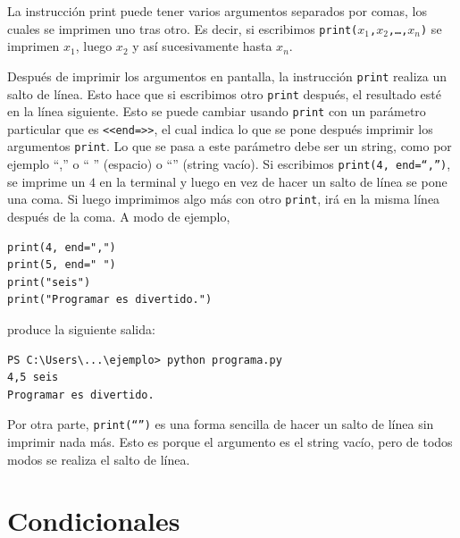 \documentclass[a4paper, 12pt]{report}
\theoremstyle{definition}
\begin{document}
La instrucción print puede tener varios argumentos separados por comas, los cuales se imprimen uno tras otro. Es decir, si escribimos {\tt print($x_1$,$x_2$,\dots,$x_n$)} se imprimen $x_1$, luego $x_2$ y así sucesivamente hasta $x_n$.

Después de imprimir los argumentos en pantalla, la instrucción {\tt print} realiza un salto de línea. Esto hace que si escribimos otro {\tt print} después, el resultado esté en la línea siguiente. Esto se puede cambiar usando {\tt print} con un parámetro particular que es {\tt <<end=>>}, el cual indica lo que se pone después imprimir los argumentos {\tt print}. Lo que se pasa a este parámetro debe ser un string, como por ejemplo ``,'' o `` '' (espacio) o ``\hspace{0.1em}'' (string vacío). Si escribimos {\tt print(4, end=``,'')}, se imprime un $4$ en la terminal y luego en vez de hacer un salto de línea se pone una coma. Si luego imprimimos algo más con otro {\tt print}, irá en la misma línea después de la coma. A modo de ejemplo,
\begin{verbatim}
print(4, end=",")
print(5, end=" ")
print("seis")
print("Programar es divertido.")
\end{verbatim}
produce la siguiente salida:
\begin{verbatim}
PS C:\Users\...\ejemplo> python programa.py
4,5 seis
Programar es divertido.
\end{verbatim}

Por otra parte, {\tt print(``\hspace{0.1em}'')}  es una forma sencilla de hacer un salto de línea sin imprimir nada más. Esto es porque el argumento es el string vacío, pero de todos modos se realiza el salto de línea.

\section{Condicionales}
\end{document}
